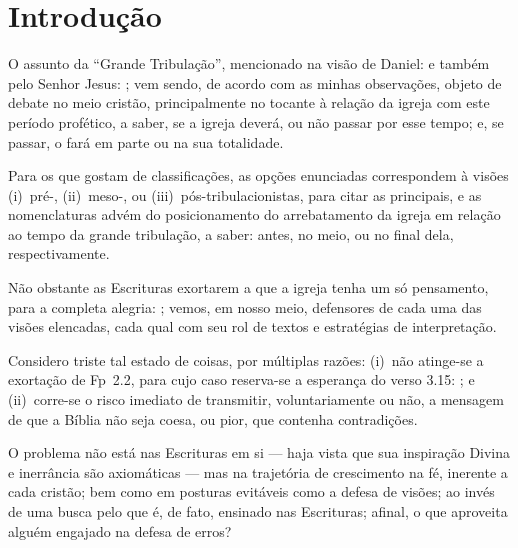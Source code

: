 \section{Introdução}

    O assunto da ``Grande Tribulação'', mencionado na visão de Daniel:  e também pelo  Senhor  Jesus:  ; vem sendo, de acordo com as minhas observações, objeto de debate no meio cristão, principalmente no
    tocante à relação da igreja com este período profético, a saber, se a igreja deverá, ou não passar por  esse  tempo;  e,  se
    passar, o fará em parte ou na sua totalidade.

    Para  os  que  gostam  de  classificações,  as  opções  enunciadas  correspondem   à   visões   (i)~pré-,   (ii)~meso-,   ou
    (iii)~pós-tribulacionistas, para citar as principais, e as nomenclaturas advém do posicionamento do arrebatamento da  igreja
    em relação ao tempo da grande tribulação, a saber: antes, no meio, ou no final dela, respectivamente.

    Não obstante as Escrituras exortarem a que a igreja tenha um só pensamento, para a completa alegria: ; vemos, em nosso meio, defensores de cada uma das visões elencadas,  cada  qual  com  seu  rol  de
    textos e estratégias de interpretação.

    Considero triste tal estado de coisas, por múltiplas razões: (i)~não  atinge-se  a  exortação  de  Fp~2.2,  para  cujo  caso
    reserva-se a esperança do verso 3.15: ; e (ii)~corre-se o  risco
    imediato de transmitir, voluntariamente ou não, a  mensagem  de  que  a  Bíblia  não  seja  coesa,  ou  pior,  que  contenha
    contradições.

    O problema não está nas Escrituras em si --- haja vista que sua inspiração Divina e inerrância são axiomáticas  ---  mas  na
    trajetória de crescimento na fé, inerente a cada cristão; bem como em posturas evitáveis como a defesa de visões;  ao  invés
    de uma busca pelo que é, de fato, ensinado nas Escrituras; afinal, o que aproveita alguém engajado na defesa de erros?

